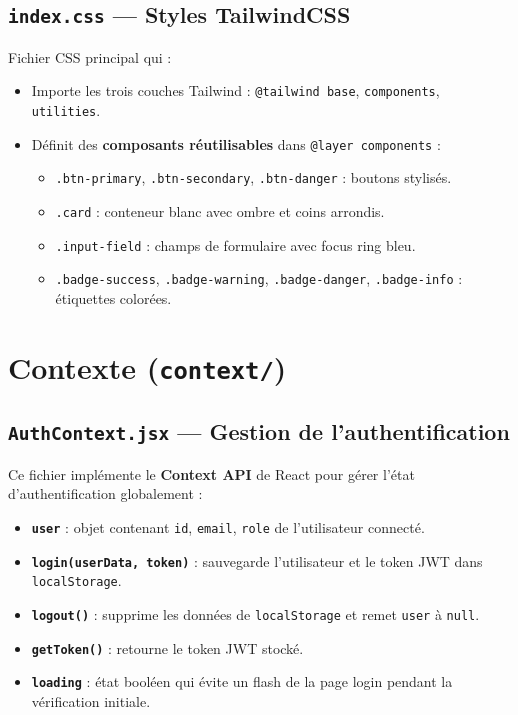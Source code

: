\documentclass[a4paper,12pt]{report}
\begin{document}
\subsection{\texttt{index.css} --- Styles TailwindCSS}
Fichier CSS principal qui :
\begin{itemize}
  \item Importe les trois couches Tailwind : \texttt{@tailwind base}, \texttt{components}, \texttt{utilities}.
  \item Définit des \textbf{composants réutilisables} dans \texttt{@layer components} :
  \begin{itemize}
    \item \texttt{.btn-primary}, \texttt{.btn-secondary}, \texttt{.btn-danger} : boutons stylisés.
    \item \texttt{.card} : conteneur blanc avec ombre et coins arrondis.
    \item \texttt{.input-field} : champs de formulaire avec focus ring bleu.
    \item \texttt{.badge-success}, \texttt{.badge-warning}, \texttt{.badge-danger}, \texttt{.badge-info} : étiquettes colorées.
  \end{itemize}
\end{itemize}

\section{Contexte (\texttt{context/})}

\subsection{\texttt{AuthContext.jsx} --- Gestion de l'authentification}
Ce fichier implémente le \textbf{Context API} de React pour gérer l'état d'authentification globalement :

\begin{itemize}
  \item \textbf{\texttt{user}} : objet contenant \texttt{id}, \texttt{email}, \texttt{role} de l'utilisateur connecté.
  \item \textbf{\texttt{login(userData, token)}} : sauvegarde l'utilisateur et le token JWT dans \texttt{localStorage}.
  \item \textbf{\texttt{logout()}} : supprime les données de \texttt{localStorage} et remet \texttt{user} à \texttt{null}.
  \item \textbf{\texttt{getToken()}} : retourne le token JWT stocké.
  \item \textbf{\texttt{loading}} : état booléen qui évite un flash de la page login pendant la vérification initiale.
\end{itemize}
\end{document}
